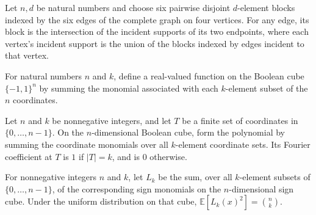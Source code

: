 \begin{theorem}
\label{FABL.SixDisjointBlockChoice.block_eq_incidentSupport_inter}
\leanok
{}
Let $n,d$ be natural numbers and choose six pairwise disjoint $d$-element blocks indexed
by the six edges of the complete graph on four vertices. For any edge, its block is the
intersection of the incident supports of its two endpoints, where each vertex's incident
support is the union of the blocks indexed by edges incident to that vertex.
\end{theorem}

\begin{definition}
\label{FABL.levelKPolynomial}
\leanok
{}
For natural numbers $n$ and $k$, define a real-valued function on the Boolean cube
$\{-1,1\}^n$ by summing the monomial associated with each $k$-element subset of the
$n$ coordinates.
\end{definition}

\begin{theorem}
\label{FABL.fourierCoeff_levelKPolynomial}
\leanok
{}
Let $n$ and $k$ be nonnegative integers, and let $T$ be a finite set of coordinates in
$\{0,\ldots,n-1\}$. On the $n$-dimensional Boolean cube, form the polynomial by
summing the coordinate monomials over all $k$-element coordinate sets. Its Fourier
coefficient at $T$ is $1$ if $|T|=k$, and is $0$ otherwise.
\end{theorem}

\begin{theorem}
\label{FABL.expect_levelKPolynomial_sq}
\leanok
{}
For nonnegative integers $n$ and $k$, let $L_k$ be the sum, over all $k$-element subsets
of $\{0,\ldots,n-1\}$, of the corresponding sign monomials on the $n$-dimensional
sign cube. Under the uniform distribution on that cube, $\mathbb
E[L_k(x)^2]=\binom{n}{k}$.
\end{theorem}

